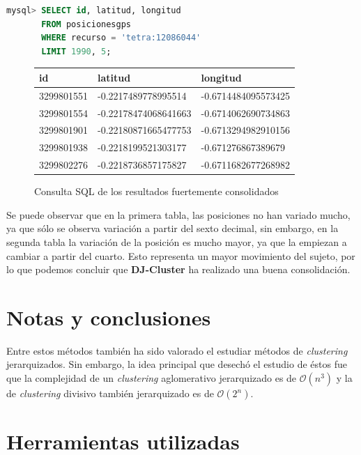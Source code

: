 \documentclass[a4paper, 12pt]{article}
\begin{document}
\begin{lstlisting}[language=sql, columns=fullflexible, basicstyle=\small, frame=tbrl, showstringspaces=false]
mysql> SELECT id, latitud, longitud 
	   FROM posicionesgps 
	   WHERE recurso = 'tetra:12086044' 
	   LIMIT 1990, 5;
\end{lstlisting}

\begin{figure}[H]
	\begin{tabular}{| l | l | l |}
	\hline
	\rowcolor{LightCyan}
	\hline
  		id & latitud & longitud \\
	\hline
	3299801551 & -0.2217489778995514 & -0.6714484095573425 \\
	3299801554 & -0.22178474068641663 & -0.6714062690734863 \\
	3299801901 & -0.22180871665477753 & -0.6713294982910156 \\
	3299801938 & -0.2218199521303177 & -0.671276867389679 \\
	3299802276 & -0.2218736857175827 & -0.6711682677268982 \\
	\hline
	\end{tabular}
	\caption{Consulta SQL de los resultados fuertemente consolidados}
\end{figure}

Se puede observar que en la primera tabla, las posiciones no han variado mucho, ya que s\'olo se observa variaci\'on a partir del sexto decimal, sin embargo, en la segunda tabla la variaci\'on de la posici\'on es mucho mayor, ya que la empiezan a cambiar a partir del cuarto. Esto representa un mayor movimiento del sujeto, por lo que podemos concluir que \textbf{DJ-Cluster} ha realizado una buena consolidaci\'on.


\pagebreak
\section{Notas y conclusiones}

Entre estos m\'etodos tambi\'en ha sido valorado el estudiar m\'etodos de \textit{clustering} jerarquizados. Sin embargo, la idea principal que desech\'o el estudio de \'estos fue que la complejidad de un \textit{clustering} aglomerativo jerarquizado es de $\mathcal{O}(n^3)$ y la de \textit{clustering} divisivo tambi\'en jerarquizado es de $\mathcal{O}(2^n)$. \\


\pagebreak
\section{Herramientas utilizadas}
\end{document}
